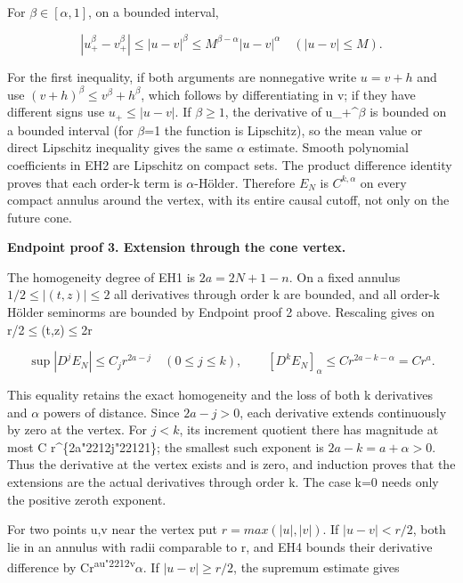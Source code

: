 \documentclass[
  11pt,
]{article}
\begin{document}
For \(\beta \in [\alpha ,1]\), on a bounded interval,

\[
 |u_+^\beta-v_+^\beta|\leq|u-v|^\beta
 \leq M^{\beta-\alpha}|u-v|^\alpha
 \quad(|u-v|\leq M).
 \tag{EH3}
\]

For the first inequality, if both arguments are nonnegative write
\(u=v+h\) and use \((v+h)^\beta \leq v^\beta +h^\beta \), which follows
by differentiating in v; if they have different signs use
\(u_+\leq |u-v|\). If \(\beta \geq 1\), the derivative of u\_+\^{}\ensuremath{\beta} is
bounded on a bounded interval (for \ensuremath{\beta}=1 the function is Lipschitz), so
the mean value or direct Lipschitz inequality gives the same \ensuremath{\alpha} estimate.
Smooth polynomial coefficients in EH2 are Lipschitz on compact sets. The
product difference identity proves that each order-k term is \ensuremath{\alpha}-Hölder.
Therefore \(E_N\) is \(C^{k,\alpha }\) on every compact annulus around
the vertex, with its entire causal cutoff, not only on the future cone.

\textbf{Endpoint proof 3. Extension through the cone vertex.}

The homogeneity degree of EH1 is \(2a=2N+1-n\). On a fixed annulus
\(1/2\leq |(t,z)|\leq 2\) all derivatives through order k are bounded,
and all order-k Hölder seminorms are bounded by Endpoint proof 2 above.
Rescaling gives on r/2\ensuremath{\leq}\textbar(t,z)\textbar\ensuremath{\leq}2r

\[
 \sup|D^jE_N|\leq C_jr^{2a-j}\quad(0\leq j\leq k),\qquad
 [D^kE_N]_{\alpha}\leq C r^{2a-k-\alpha}=Cr^a.
 \tag{EH4}
\]

This equality retains the exact homogeneity and the loss of both k
derivatives and \ensuremath{\alpha} powers of distance. Since \(2a-j>0\), each derivative
extends continuously by zero at the vertex. For \(j<k\), its increment
quotient there has magnitude at most C r\^{}\{2a{\ReaderSymbols\char"2212}j{\ReaderSymbols\char"2212}1\}; the smallest
such exponent is \(2a-k=a+\alpha >0\). Thus the derivative at the vertex
exists and is zero, and induction proves that the extensions are the
actual derivatives through order k. The case k=0 needs only the positive
zeroth exponent.

For two points u,v near the vertex put \(r=max(|u|,|v|)\). If
\(|u-v|<r/2\), both lie in an annulus with radii comparable to r, and
EH4 bounds their derivative difference by
Cr\textsuperscript{a\textbar u{\ReaderSymbols\char"2212}v\textbar{}}\ensuremath{\alpha}. If \(|u-v|\geq r/2\), the
supremum estimate gives
\end{document}
